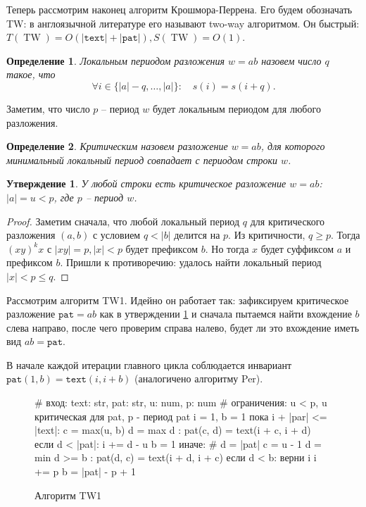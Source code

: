 \documentclass[10pt]{book}
\theoremstyle{plain}
\newtheorem{stm}{Утверждение}[section]
\newtheorem{definition}{Определение}[section]
\newcommand{\textm}{\texttt{text}}
\newcommand{\patm}{\texttt{pat}}
\newcommand{\algm}[1]{\operatorname{#1}}
\newenvironment{figurem}[1][]
  {\begin{figure}[p]
  \caption{#1}
  \centering
  }
  {
  \end{figure}
  }
\begin{document}
Теперь рассмотрим наконец алгоритм Крошмора-Перрена. Его будем обозначать TW:
в англоязычной литературе его называют two-way алгоритмом. Он быстрый:
$T(\algm{TW}) = O(|\textm| + |\patm|), S(\algm{TW}) = O(1)$.

\begin{definition}
  Локальным периодом разложения $w = ab$ назовем число $q$ такое, что
  $$\forall i \in \{|a| - q, \ldots, |a|\}: \quad s(i) = s(i + q).$$
\end{definition}

Заметим, что число $p$ -- период $w$ будет локальным периодом для любого
разложения.

\begin{definition}
  Критическим назовем разложение $w = ab$, для которого минимальный локальный
  период совпадает с периодом строки $w$.
\end{definition}

\begin{stm}
  \label{crit_stm}
  У любой строки есть критическое разложение $w = ab$: $|a| = u < p$, где $p$
  -- период $w$. 
\end{stm}
\begin{proof}

Заметим сначала, что любой локальный период $q$ для критического разложения 
$(a,b)$ с условием $q < |b|$ делится на $p$. Из критичности, $q \ge p$. Тогда 
$(xy)^kx$ с $|xy| = p, |x| < p$ будет префиксом $b$. Но тогда $x$ будет 
суффиксом $a$ и префиксом $b$. Пришли к противоречию: удалось найти локальный
период $|x| < p \le q$.
  
\end{proof}

Рассмотрим алгоритм TW1. Идейно он работает так: зафиксируем критическое 
разложение $\patm = ab$ как в утверждении \ref{crit_stm} и
сначала пытаемся найти вхождение $b$ слева направо,
после чего проверим справа налево, будет ли это вхождение иметь вид
$ab = \patm$.

В начале каждой итерации главного цикла соблюдается инвариант
$\patm(1,b) = \textm(i,i+b)$ (аналогичено алгоритму Per).

\begin{figurem}[Алгоритм TW1]
\begin{verbm}
  # вход: text: str, pat: str, u: num, p: num 
  # ограничения: u < p, u критическая для pat, p - период pat
  i = 1, b = 1
  пока i + |par| <= |text|:
    c = max(u, b)
    d = max { d : pat(c, d) = text(i + c, i + d) }
    если d < |pat|:
      i += d - u
      b = 1
    иначе:  # d = |pat|
      c = u - 1
      d = min { d >= b : pat(d, c) = text(i + d, i + c) }
      если d < b:
        верни i
      i += p
      b = |pat| - p + 1
\end{verbm}
\end{figurem}
\end{document}
